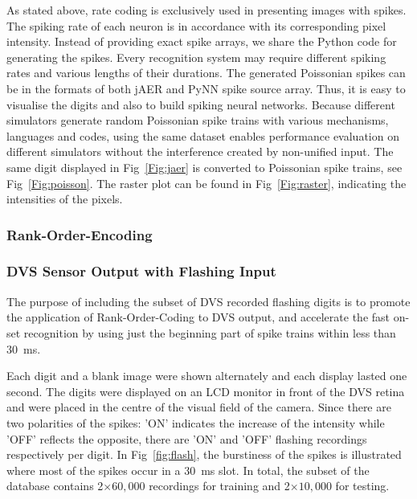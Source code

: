 	As stated above, rate coding is exclusively used in presenting images with spikes.
	The spiking rate of each neuron is in accordance with its corresponding pixel intensity.
	Instead of providing exact spike arrays, we share the Python code for generating the spikes.
	Every recognition system may require different spiking rates and various lengths of their durations.
	The generated Poissonian spikes can be in the formats of both jAER and PyNN spike source array.
	Thus, it is easy to visualise the digits and also to build spiking neural networks.
	Because different simulators generate random Poissonian spike trains with various mechanisms, languages and codes, using the same dataset enables performance evaluation on different simulators without the interference created by non-unified input.
	The same digit displayed in Fig~\ref{Fig:jaer} is converted to Poissonian spike trains, see Fig~\ref{Fig:poisson}.
	The raster plot can be found in Fig~\ref{Fig:raster}, indicating the intensities of the pixels.


	
	\subsubsection{Rank-Order-Encoding}
  
	\subsubsection{DVS Sensor Output with Flashing Input}
	\label{subsec_flash}
	The purpose of including the subset of DVS recorded flashing digits is to promote the application of Rank-Order-Coding to DVS output, and accelerate the fast on-set recognition by using just the beginning part of spike trains within less than 30~ms.
	
	Each digit and a blank image were shown alternately and each display lasted one second.
	The digits were displayed on an LCD monitor in front of the DVS retina~\citep{serrano2013128} and were placed in the centre of the visual field of the camera.
	Since there are two polarities of the spikes: 'ON' indicates the increase of the intensity while 'OFF' reflects the opposite, there are 'ON' and 'OFF' flashing recordings respectively per digit.
	In Fig~\ref{fig:flash}, the burstiness of the spikes is illustrated where most of the spikes occur in a 30~ms slot. 
	In total, the subset of the database contains 2$\times$$60,000$ recordings for training and 2$\times$$10,000$ for testing.

